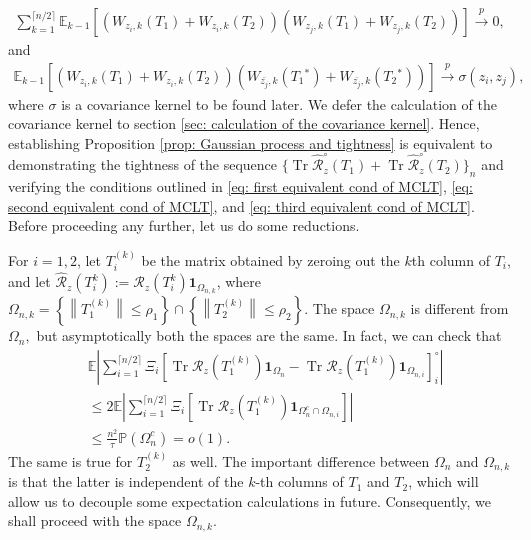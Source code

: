\documentclass[12pt]{amsart}
\theoremstyle{plain}
\theoremstyle{definition}
\newcommand{\conjugate}{{\operatorname{^*}}}
\newcommand{\Tr}{\operatorname{Tr}}
\newcommand{\norm}[1]{\left\lVert#1\right\rVert}
\begin{document}
\begin{align}
\sum_{k=1}^{\lceil n/2 \rceil}\mathbb{E}_{k-1}[(W_{z_i,k}(T_1)+W_{z_i,k}(T_2))(W_{z_j,k}(T_1)+W_{z_j,k}(T_2))]\stackrel{p}{\rightarrow} 0, \label{eq: second equivalent cond of MCLT} 
\end{align}
and
\begin{align}
\mathbb{E}_{k-1}[(W_{z_{i},k}(T_1)+W_{z_{i},k}(T_2))(W_{\bar{z_{j}},k}(T_1\conjugate)+W_{\bar{z_{j}},k}(T_2\conjugate))] \stackrel{p}{\rightarrow} \sigma\left(z_i, z_j\right), \label{eq: third equivalent cond of MCLT}
\end{align}
where $\sigma$ is a covariance kernel to be found later. We defer the calculation of the covariance kernel to section \ref{sec: calculation of the covariance kernel}. Hence, establishing Proposition \ref{prop: Gaussian process and tightness} is equivalent to demonstrating the tightness of the sequence $\{\Tr  \hat{\mathcal{R}}_{z}^{\circ}(T_1)+\Tr \hat{\mathcal{R}}_{z}^{\circ}(T_2)\}_n$ and verifying the conditions outlined in \eqref{eq: first equivalent cond of MCLT}, \eqref{eq: second equivalent cond of MCLT}, and \eqref{eq: third equivalent cond of MCLT}. Before proceeding any further, let us do some reductions.

For $i=1,2$, let $T_{i}^{(k)}$ be the matrix obtained by zeroing out the $k$th column of $T_i$, and let $\hat{\mathcal{R}}_{z}(T_i^k) := \mathcal{R}_{z}(T_i^k)\mathbf{1}_{\Omega_{n,k}}$,
where $\Omega_{n,k}=  \left\{\norm{T_{1}^{(k)}}\leq \rho_1 \right\} \cap \left\{\norm{T_{2}^{(k)}}\leq \rho_2 \right\}.$ The space $\Omega_{n,k}$ is different from $\Omega_{n},$ but asymptotically both the spaces are the same. In fact, we can check that
\begin{align*}
    &\mathbb{E}\left|\sum_{i=1}^{\lceil n/2 \rceil}\Xi_{i}\left[\Tr \mathcal{R}_{z}(T_{1}^{(k)})\mathbf{1}_{\Omega_{n}}-\Tr \mathcal{R}_{z}(T_{1}^{(k)})\mathbf{1}_{\Omega_{n, i}}\right]_{i}^{\circ}\right|\\
    &\leq 2\mathbb{E}\left|\sum_{i=1}^{\lceil n/2 \rceil}\Xi_{i}\left[\Tr \mathcal{R}_{z}(T_{1}^{(k)})\mathbf{1}_{\Omega_{n}^{c}\cap \Omega_{n, i}}\right]\right|\\
    &\leq \frac{n^{2}}{\tau}\mathbb{P}(\Omega_{n}^c)=o(1).
\end{align*}
The same is true for $T_{2}^{(k)}$ as well. The important difference between $\Omega_{n}$ and $\Omega_{n, k}$ is that the latter is independent of the $k$-th columns of $T_{1}$ and $T_{2}$, which will allow us to decouple some expectation calculations in future. Consequently, we shall proceed with the space $\Omega_{n,k}$.
\end{document}
